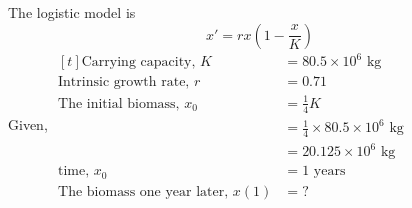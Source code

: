 \documentclass[../main-sheet.tex]{subfiles}
\begin{document}
\begin{soln}
    The logistic model is
    \begin{equation}
        x'=rx\left(1-\frac{x}{K}\right)\label{eq:probdef4.1}
    \end{equation}
    Given, \(\begin{aligned}[t]
        \text{Carrying capacity, } K&=80.5\times 10^6 \text{ kg}\\
        \text{Intrinsic growth rate, } r&=0.71\\
        \text{The initial biomass, } x_0&=\frac{1}{4}K\\
        &=\frac{1}{4}\times 80.5\times 10^6 \text{ kg}\\
        &=20.125\times 10^6 \text{ kg}\\
        \text{time, } x_0&=1\text{ years}\\
        \text{The biomass one year later, } x(1)&=?
    \end{aligned}\)\\



\end{soln}
\end{document}
